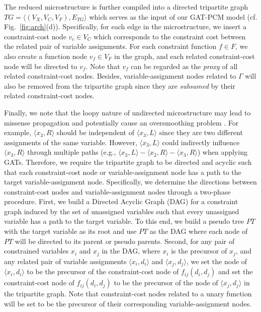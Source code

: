 \documentclass[letterpaper]{article} %
\begin{document}
The reduced microstructure is further compiled into a directed tripartite graph $TG=\langle (V_X, V_C,V_F),E_{TG}\rangle$ which serves as the input of our GAT-PCM model (cf. Fig.~\ref{fig:arch}(d)). Specifically, for each edge in the microstructure, we insert a constraint-cost node $v_c\in V_C$ which corresponds to the constraint cost between the related pair of variable assignments. For each constraint function $f\in F$, we also create a function node $v_f \in V_F$ in the graph, and each related constraint-cost node will be directed to $v_f$. Note that $v_f$ can be regarded as the \emph{proxy} of all related constraint-cost nodes.
Besides, variable-assignment nodes related to $\Gamma$ will also be removed from the tripartite graph since they are \emph{subsumed} by their related constraint-cost nodes.

Finally, we note that the loopy nature of undirected microstructure may lead to missense propagation and potentially cause an oversmoothing problem \cite{li2019deepgcns}. For example, $\langle x_3, R\rangle$ should be independent of $\langle x_3, L\rangle$ since they are two different assignments of the same variable. However, $\langle x_3, L\rangle$ could indirectly influence $\langle x_3, R\rangle$ through multiple paths (e.g., $\langle x_3, L\rangle-\langle x_2, R\rangle-\langle x_3, R\rangle$) when applying GATs. Therefore, we require the tripartite graph to be directed and acyclic such that each constraint-cost node or variable-assignment node has a path to the target variable-assignment node. Specifically, we determine the directions between constraint-cost nodes and variable-assignment nodes through a two-phase procedure. First, we build a Directed Acyclic Graph (DAG) for a constraint graph induced by the set of unassigned variables such that every unassigned variable has a path to the target variable. To this end, we build a pseudo tree $PT$ \cite{freuder1985taking} with the target variable as its root and use $PT$ as the DAG where each node of $PT$ will be directed to its parent or pseudo parents. Second, for any pair of constrained variables $x_i$ and $x_j$ in the DAG, where $x_i$ is the precursor of $x_j$, and any related pair of variable assignments $\langle x_i,d_i\rangle$ and $\langle x_j,d_j\rangle$, we set the node of $\langle x_i,d_i\rangle$ to be the precursor of the constraint-cost node of $f_{ij}(d_i,d_j)$ and set the constraint-cost node of $f_{ij}(d_i,d_j)$ to be the precursor of the node of $\langle x_j,d_j\rangle$ in the tripartite graph.
Note that constraint-cost nodes related to a unary function will be set to be the precursor of their corresponding variable-assignment nodes.
\end{document}

